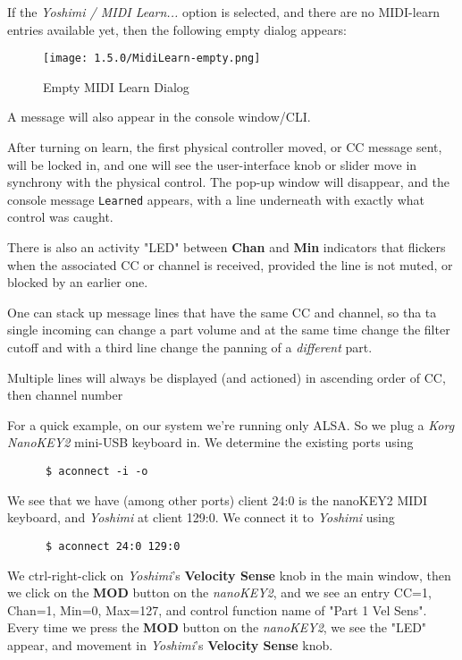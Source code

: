    If the \textsl{Yoshimi / MIDI Learn...} option is selected, and there are no
   MIDI-learn entries available yet, then the following empty dialog appears:

\begin{figure}[H]
   \centering 
   \texttt{[image: 1.5.0/MidiLearn-empty.png]}
   \caption{Empty MIDI Learn Dialog}
   \label{fig:empty_midi_learn_dialog}
\end{figure}

   A message will also appear in the console window/CLI.

   After turning on learn, the first physical controller moved, or CC message
   sent, will be locked in, and one will see the user-interface knob or slider
   move in synchrony with the physical control. The pop-up window will
   disappear, and the console message \texttt{Learned} appears, with a line
   underneath with exactly what control was caught.

   There is also an activity "LED" between \textbf{Chan} and
   \textbf{Min} indicators that flickers when the associated CC or channel
   is received, provided the line is not muted, or blocked by an earlier one.

   One can stack up message lines that have the same CC and channel, so tha ta
   single incoming can change a part volume and at the same time change the
   filter cutoff and with a third line change the panning of a
   \textsl{different} part.

   Multiple lines will always be displayed (and actioned) in ascending order of
   CC, then channel number

   For a quick example, on our system we're running only ALSA.  So we
   plug a \textsl{Korg NanoKEY2} mini-USB keyboard in.
   We determine the existing ports using

   \begin{verbatim}
      $ aconnect -i -o
   \end{verbatim}
   
   We see that we have (among other ports) client 24:0 is the nanoKEY2 MIDI
   keyboard, and \textsl{Yoshimi} at client 129:0.
   We connect it to \textsl{Yoshimi} using

   \begin{verbatim}
      $ aconnect 24:0 129:0
   \end{verbatim}

   We ctrl-right-click on \textsl{Yoshimi}'s \textbf{Velocity Sense} knob in
   the main window, then we click on the \textbf{MOD} button on the
   \textsl{nanoKEY2}, and we see an entry CC=1, Chan=1, Min=0, Max=127, and
   control function name of "Part 1 Vel Sens".  Every time we press the
   \textbf{MOD} button on the \textsl{nanoKEY2}, we see the "LED" appear, and
   movement in \textsl{Yoshimi}'s \textbf{Velocity Sense} knob.

